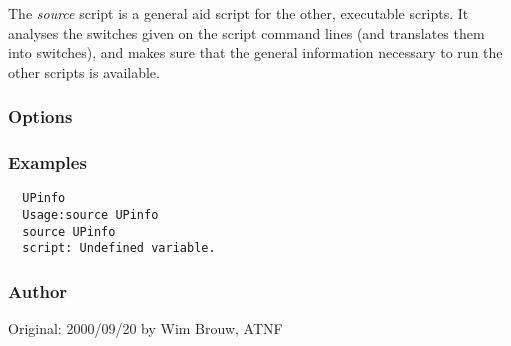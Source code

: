 \noindent
The  {\em source} script is a general aid script for the other,
executable  scripts. It analyses the switches given on the script
command lines (and translates them into switches), and makes sure that the
general information necessary to run the other scripts is available.

\subsubsection*{Options}

\subsubsection*{Examples}

\begin{verbatim}
  UPinfo
  Usage:source UPinfo
  source UPinfo
  script: Undefined variable.
\end{verbatim}

\subsubsection*{Author}

Original: 2000/09/20 by Wim Brouw, ATNF

